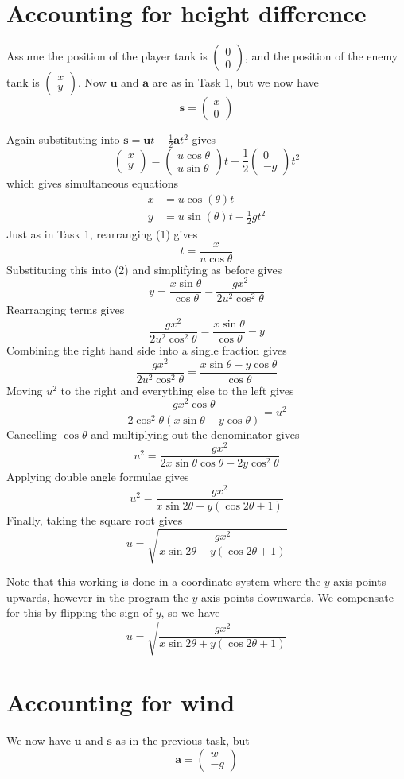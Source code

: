 \documentclass{article}
\newcommand{\colvec}[2]{\begin{pmatrix}#1\\#2\end{pmatrix}}
\begin{document}
\section{Accounting for height difference}

Assume the position of the player tank is $\colvec{0}{0}$, and the position of the enemy tank is $\colvec{x}{y}$.
Now $\mathbf{u}$ and $\mathbf{a}$ are as in Task 1, but we now have
$$ \mathbf{s} = \colvec{x}{0} $$

Again substituting into $\mathbf{s} = \mathbf{u}t + \frac12\mathbf{a}t^2$ gives
$$ \colvec{x}{y} = \colvec{u\cos\theta}{u\sin\theta} t + \frac12 \colvec{0}{-g} t^2 $$
which gives simultaneous equations
\begin{align}
    x &= u \cos(\theta) t \tag{1} \\
    y &= u \sin(\theta) t - \frac12 g t^2 \tag{2}
\end{align}
Just as in Task 1, rearranging (1) gives 
$$ t = \frac{x}{u \cos\theta} $$
Substituting this into (2) and simplifying as before gives
$$ y = \frac{x \sin\theta}{\cos\theta} - \frac{g x^2}{2 u^2 \cos^2 \theta} $$
Rearranging terms gives
$$ \frac{g x^2}{2 u^2 \cos^2 \theta} = \frac{x \sin\theta}{\cos\theta} - y $$
Combining the right hand side into a single fraction gives
$$ \frac{g x^2}{2 u^2 \cos^2 \theta} = \frac{x \sin\theta - y \cos\theta}{\cos\theta} $$
Moving $u^2$ to the right and everything else to the left gives
$$ \frac{g x^2 \cos\theta}{2 \cos^2 \theta (x \sin\theta - y \cos\theta)} = u^2 $$
Cancelling $\cos\theta$ and multiplying out the denominator gives
$$ u^2 = \frac{g x^2}{2x \sin\theta \cos\theta - 2y \cos^2\theta} $$
Applying double angle formulae gives
$$ u^2 = \frac{g x^2}{x \sin 2\theta - y (\cos 2\theta + 1)} $$
Finally, taking the square root gives
$$ u = \sqrt{\frac{g x^2}{x \sin 2\theta - y (\cos 2\theta + 1)}} $$

Note that this working is done in a coordinate system where the $y$-axis points upwards,
however in the program the $y$-axis points downwards.
We compensate for this by flipping the sign of $y$, so we have
$$ u = \sqrt{\frac{g x^2}{x \sin 2\theta + y (\cos 2\theta + 1)}} $$

\section{Accounting for wind}
We now have $\mathbf{u}$ and $\mathbf{s}$ as in the previous task, but
$$ \mathbf{a} = \colvec{w}{-g} $$
\end{document}
